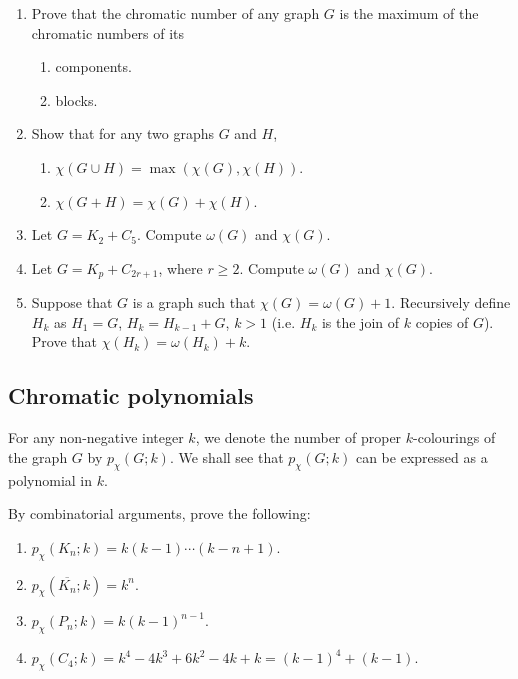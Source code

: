 \begin{Exercise}
\begin{enumerate}
\item Prove that the chromatic number of any graph $G$ is the maximum of the chromatic numbers of its
\begin{enumerate}[label = (\roman*)]
\item components.
\item blocks.
\end{enumerate}

\item Show that for any two graphs $G$ and $H$,
\begin{enumerate}[label = (\roman*)]
\item $\chi(G \cup H) = \max(\chi(G), \chi(H))$.
\item $\chi(G + H) = \chi(G) + \chi(H)$.
\end{enumerate}

\item Let $G = K_2 + C_5$. Compute $\omega(G)$ and $\chi(G)$.

\item Let $G = K_p + C_{2r + 1}$, where $r \ge 2$. Compute $\omega(G)$ and $\chi(G)$.

\item Suppose that $G$ is a graph such that $\chi(G) = \omega(G) + 1$. Recursively define $H_k$ as $H_1 = G$, $H_k = H_{k - 1} + G$, $k > 1$ (i.e. $H_k$ is the join of $k$ copies of $G$). Prove that $\chi(H_k) = \omega(H_k) + k$.
\end{enumerate}
\end{Exercise}

\subsection*{Chromatic polynomials}\label{subsec:ChromaticPolynomials}

For any non-negative integer $k$, we denote the number of proper $k$-colourings of the graph $G$ by $p_\chi(G; k)$. We shall see that $p_\chi(G; k)$ can be expressed as a polynomial in $k$.

\begin{Exercise}
By combinatorial arguments, prove the following:
\begin{enumerate}
\item $p_\chi(K_n; k) = k(k - 1) \cdots (k - n + 1)$.

\item $p_\chi(\overline{K_n}; k) = k^n$.

\item $p_\chi(P_n; k) = k(k - 1)^{n - 1}$.

\item $p_\chi(C_4; k) = k^4 - 4k^3 + 6k^2 - 4k + k = (k - 1)^4 + (k - 1)$. 
\end{enumerate}
\end{Exercise}

